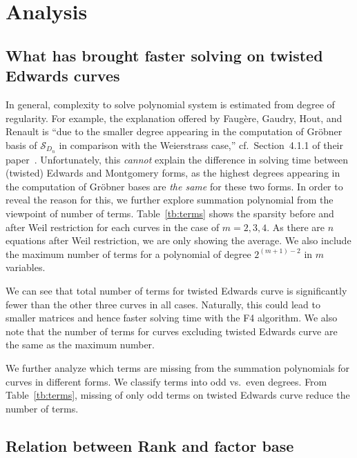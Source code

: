 
\section{Analysis}
\label{analysis}

\subsection{What has brought faster solving on twisted Edwards curves}

In general, complexity to solve polynomial system is 
estimated from degree of regularity.
%
For example, 
the explanation offered by Faug\`ere, Gaudry, Hout, and Renault is
``due to the smaller degree appearing in the computation of Gr\"obner
basis of $\mathscr S_{D_n}$ in comparison with the Weierstrass case,''
cf.~Section~4.1.1 of their
paper~\cite{DBLP:journals/joc/FaugereGHR14}.
%
Unfortunately, 
this \emph{cannot} explain the difference in solving time between
(twisted) Edwards and Montgomery forms, as the highest degrees
appearing in the computation of Gr\"obner bases are \emph{the same}
for these two forms.
%
In order to reveal the reason for this, we further explore 
summation polynomial from the viewpoint of number of terms.
%
Table~\ref{tb:terms} shows the sparsity before and after Weil
restriction for each curves in the case of $m=2,3,4$.
%
As there are $n$ equations after Weil restriction, we are only showing
the average. 
%
We also include the maximum number of terms for a polynomial of degree
$2^{(m+1)-2}$ in $m$ variables.
%

%
We can see that total number of terms for twisted Edwards curve is
significantly fewer than the other three curves in all cases.
%
Naturally, this could lead to smaller matrices and hence faster
solving time with the F4 algorithm.
%
We also note that the number of terms for curves 
excluding twisted Edwards curve are the same as the maximum number.

We further analyze which terms are missing from the summation
polynomials for curves in different forms.
%
We classify terms into odd vs.~even degrees.
%
From Table~\ref{tb:terms}, missing of only odd terms on twisted Edwards
curve reduce the number of terms.




\subsection{Relation between Rank and factor base}

